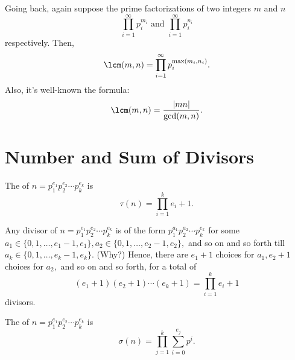 \documentclass[11pt,paper=letter]{scrartcl}
\begin{document}
Going back, again suppose the prime factorizations of two integers $m$ and $n$ \[\prod_{i=1}^{\infty} p_i^{m_i} \text{ and } \prod_{i=1}^{\infty} p_i^{n_i}\] respectively. Then, \[\lcm(m, n) = \prod_{i = 1}^{\infty} p_i^{\max(m_i, n_i)}.\] Also, it's well-known the formula: \[\lcm(m, n) = \frac{|mn|}{\gcd(m, n)}.\]

\section{Number and Sum of Divisors}

\begin{probboxed}
The  of $n=p_1^{e_1}p_2^{e_2}\cdots p_k^{e_k}$ is \[\tau(n) = \prod_{i = 1}^{k} e_i + 1.\]
\end{probboxed}
Any divisor of $n = p_1^{e_1}p_2^{e_2}\cdots p_k^{e_k}$ is of the form $p_1^{a_1}p_2^{a_2}\cdots p_k^{e_k}$ for some $a_1 \in \{0, 1, \dots, e_1 - 1, e_1\}, a_2 \in \{0, 1, \dots, e_2 - 1, e_2\},$ and so on and so forth till $a_k \in \{0, 1, \dots, e_k - 1, e_k\}.$ (Why?) Hence, there are $e_1 + 1$ choices for $a_1, e_2 + 1$ choices for $a_2,$ and so on and so forth, for a total of \[(e_1 + 1)(e_2 + 1)\cdots(e_k + 1) = \prod_{i = 1}^{k} e_i + 1\]  divisors.

\begin{probboxed}
The  of $n=p_1^{e_1}p_2^{e_2}\cdots p_k^{e_k}$ is \[\sigma(n) = \prod_{j = 1}^{k}\sum_{i = 0}^{e_j} p^i.\]
\end{probboxed}
\end{document}
